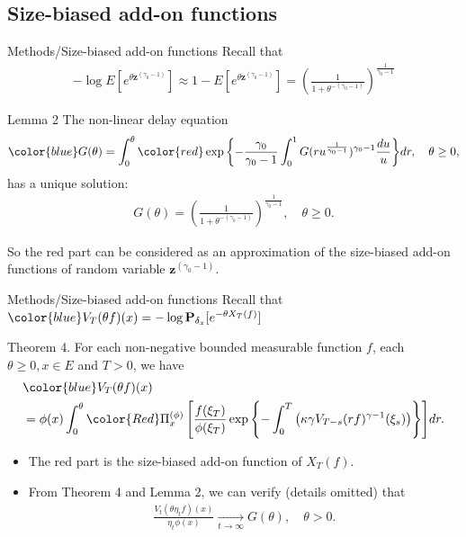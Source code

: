 \documentclass[xcolor=dvipsnames]{beamer}
\begin{document}
\subsection{Size-biased add-on functions}

\begin{frame}{Methods/Size-biased add-on functions}
Recall that
\begin{align}
- \log E[e^{\theta \mathbf z^{(\gamma_0 - 1)}}] 
  \approx 1 -  E[e^{\theta \mathbf z^{(\gamma_0 - 1)}}] 
= \left( \frac{1}{1+\theta^{-(\gamma_0- 1)}} \right)^{\frac{1}{\gamma_0 - 1}}
\end{align}
\begin{block}{Lemma 2}
The non-linear delay equation 
 \begin{align}
{\color{blue} G(\theta) } 
= \int_0^\theta {\color{red}\exp\left\{ - \frac{\gamma_0}{\gamma_0 - 1} \int_0^1  G(ru^{\frac{1}{\gamma_0 - 1}})^{\gamma_0 - 1} \frac{du}{u} \right\} } dr,
\quad \theta \geq 0,
  \end{align}
has a unique solution:
\begin{align}
G(\theta) 
  = \left( \frac{1}{1+\theta^{-(\gamma_0- 1)}} \right)^{\frac{1}{\gamma_0 - 1}},
\quad \theta \geq 0. 
\end{align}
\end{block}

So the {\color{red} red part} can be considered as an approximation of the size-biased add-on functions of random variable $\mathbf z^{(\gamma_0 - 1)}$.
\end{frame}

\begin{frame}{Methods/Size-biased add-on functions}
  Recall that ${\color{blue} V_T(\theta f)(x)} = - \log \mathbf P_{\delta_x}[e^{- \theta X_T(f)}]$
  \begin{block}{Theorem 4.}
    For each non-negative bounded measurable function $f$, each $\theta \geq 0, x\in E$ and $T > 0$, we have
    \begin{align}
      &{\color{blue}V_T(\theta f)(x)} 
      \\&= \phi(x) \int_0^\theta {\color{Red} \Pi_{x}^{(\phi)} \left[ \frac{f(\xi_T)}{\phi(\xi_T)} \exp \left\{ - \int_0^T \left( \kappa \gamma V_{T - s}(rf)^{\gamma - 1} (\xi_s) \right) \right\}\right] } dr.
    \end{align}
  \end{block}
\begin{itemize}
\item
  The {\color{red} red} part is the size-biased add-on function of $X_T(f)$.
\item  
From Theorem 4 and Lemma 2, we can verify (details omitted) that
  \begin{align}
    \frac{V_t(\theta \eta_t f)(x)}{\eta_t \phi(x)} 
    \xrightarrow[t\to \infty]{} G(\theta),\quad \theta >0.
  \end{align}
\end{itemize}
\end{frame}
\end{document}
